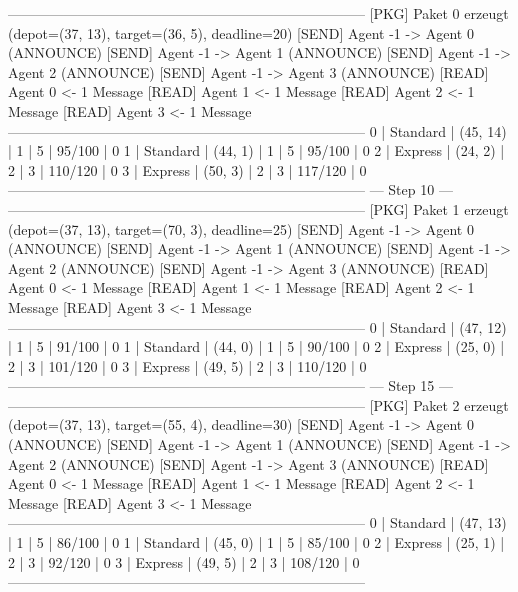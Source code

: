 -----------------------------------------------------------------------------
[PKG]      Paket 0 erzeugt (depot=(37, 13), target=(36, 5), deadline=20)
[SEND]    Agent -1 -> Agent 0 (ANNOUNCE)
[SEND]    Agent -1 -> Agent 1 (ANNOUNCE)
[SEND]    Agent -1 -> Agent 2 (ANNOUNCE)
[SEND]    Agent -1 -> Agent 3 (ANNOUNCE)
[READ]    Agent 0 <- 1 Message
[READ]    Agent 1 <- 1 Message
[READ]    Agent 2 <- 1 Message
[READ]    Agent 3 <- 1 Message
-----------------------------------------------------------------------------
 0     | Standard  | (45, 14)    | 1       | 5          | 95/100    | 0
 1     | Standard  | (44, 1)     | 1       | 5          | 95/100    | 0
 2     | Express   | (24, 2)     | 2       | 3          | 110/120   | 0
 3     | Express   | (50, 3)     | 2       | 3          | 117/120   | 0
-----------------------------------------------------------------------------
                               --- Step 10 ---
-----------------------------------------------------------------------------
[PKG]      Paket 1 erzeugt (depot=(37, 13), target=(70, 3), deadline=25)
[SEND]    Agent -1 -> Agent 0 (ANNOUNCE)
[SEND]    Agent -1 -> Agent 1 (ANNOUNCE)
[SEND]    Agent -1 -> Agent 2 (ANNOUNCE)
[SEND]    Agent -1 -> Agent 3 (ANNOUNCE)
[READ]    Agent 0 <- 1 Message
[READ]    Agent 1 <- 1 Message
[READ]    Agent 2 <- 1 Message
[READ]    Agent 3 <- 1 Message
-----------------------------------------------------------------------------
 0     | Standard  | (47, 12)    | 1       | 5          | 91/100    | 0
 1     | Standard  | (44, 0)     | 1       | 5          | 90/100    | 0
 2     | Express   | (25, 0)     | 2       | 3          | 101/120   | 0
 3     | Express   | (49, 5)     | 2       | 3          | 110/120   | 0
-----------------------------------------------------------------------------
                               --- Step 15 ---
-----------------------------------------------------------------------------
[PKG]      Paket 2 erzeugt (depot=(37, 13), target=(55, 4), deadline=30)
[SEND]    Agent -1 -> Agent 0 (ANNOUNCE)
[SEND]    Agent -1 -> Agent 1 (ANNOUNCE)
[SEND]    Agent -1 -> Agent 2 (ANNOUNCE)
[SEND]    Agent -1 -> Agent 3 (ANNOUNCE)
[READ]    Agent 0 <- 1 Message
[READ]    Agent 1 <- 1 Message
[READ]    Agent 2 <- 1 Message
[READ]    Agent 3 <- 1 Message
-----------------------------------------------------------------------------
 0     | Standard  | (47, 13)    | 1       | 5          | 86/100    | 0
 1     | Standard  | (45, 0)     | 1       | 5          | 85/100    | 0
 2     | Express   | (25, 1)     | 2       | 3          | 92/120    | 0
 3     | Express   | (49, 5)     | 2       | 3          | 108/120   | 0
-----------------------------------------------------------------------------